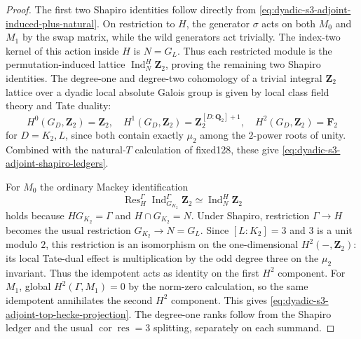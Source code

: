\documentclass[11pt]{article}
\theoremstyle{definition}
\begin{document}
\begin{proof}
The first two Shapiro identities
follow directly from
\eqref{eq:dyadic-s3-adjoint-induced-plus-natural}.
On restriction to $H$,
the generator $\sigma$ acts
on both $M_0$ and $M_1$
by the swap matrix, while
the wild generators act
trivially.  The index-two
kernel of this action
inside $H$ is $N=G_L$.
Thus each restricted module
is the permutation-induced
lattice $\operatorname{Ind}_N^H
\mathbf Z_2$, proving the
remaining two Shapiro identities.
The degree-one
and degree-two cohomology
of a trivial integral
$\mathbf Z_2$ lattice
over a dyadic local
absolute Galois group
is given by local class
field theory and Tate
duality:
\[
H^0(G_D,\mathbf Z_2)=\mathbf Z_2,
\quad H^1(G_D,\mathbf Z_2)
=\mathbf Z_2^{[D:\mathbf Q_2]+1},
\quad H^2(G_D,\mathbf Z_2)=\mathbf F_2
\]
for $D=K_2,L$, since
both contain exactly $\mu_2$
among the $2$-power roots
of unity.  Combined with
the natural-$T$ calculation
of fixed128, these give
\eqref{eq:dyadic-s3-adjoint-shapiro-ledgers}.

For $M_0$ the ordinary Mackey
identification
\[
\operatorname{Res}_H^\Gamma
\operatorname{Ind}_{G_{K_2}}^\Gamma
\mathbf Z_2
\simeq
\operatorname{Ind}_N^H\mathbf Z_2
\]
holds because $H G_{K_2}=\Gamma$
and $H\cap G_{K_2}=N$.
Under Shapiro, restriction
$\Gamma\to H$ becomes
the usual restriction
$G_{K_2}\to N=G_L$.
Since $[L:K_2]=3$ and
$3$ is a unit modulo $2$,
this restriction is an
isomorphism on the
one-dimensional
$H^2(-,\mathbf Z_2)$:
its local Tate-dual
effect is multiplication
by the odd degree three
on the $\mu_2$ invariant.
Thus the idempotent
acts as identity on
the first $H^2$ component.
For $M_1$, global
$H^2(\Gamma,M_1)=0$ by
the norm-zero calculation,
so the same idempotent
annihilates the second
$H^2$ component.
This gives
\eqref{eq:dyadic-s3-adjoint-top-hecke-projection}.
The degree-one ranks follow
from the Shapiro ledger
and the usual
$\operatorname{cor}\operatorname{res}=3$
splitting, separately on
each summand.
\end{proof}
\end{document}
